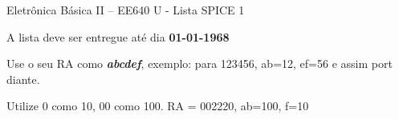 \documentclass[addpoints]{exam}
\begin{document}
 
\begin{center}
Eletrônica Básica II – EE640 U - Lista SPICE 1
\end{center}
 
\vspace{5mm}
 
\hfill
{}

\begin{center}
A lista deve ser entregue até dia \textbf{01-01-1968}

\vspace{5mm}

Use o seu RA como \textit{\textbf{abcdef}}, exemplo: para 123456, ab=12, ef=56 e assim port diante.

Utilize 0 como 10, 00 como 100. RA = 002220, ab=100, f=10
\end{center}

\hspace{2mm}

\begin{center}
\gradetable[h][questions]
\end{center}

\hspace{2mm}
\end{document}
